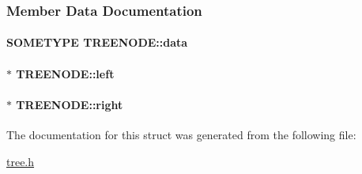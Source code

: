 \subsubsection{Member Data Documentation}
\hypertarget{structTREENODE_a16ae670d55c94f5358ae792a513e1e3c}{
\paragraph[{data}]{\setlength{\rightskip}{0pt plus 5cm}S\+O\+M\+E\+T\+Y\+P\+E T\+R\+E\+E\+N\+O\+D\+E\+::data}}\label{structTREENODE_a16ae670d55c94f5358ae792a513e1e3c}
\hypertarget{structTREENODE_a410b5b4e739703d7604d2bc7c5eddda9}{
\paragraph[{left}]{$\ast$ T\+R\+E\+E\+N\+O\+D\+E\+::left}}\label{structTREENODE_a410b5b4e739703d7604d2bc7c5eddda9}
\hypertarget{structTREENODE_a8b5bca93407a19121eefe5e0f08c4307}{
\paragraph[{right}]{$\ast$ T\+R\+E\+E\+N\+O\+D\+E\+::right}}\label{structTREENODE_a8b5bca93407a19121eefe5e0f08c4307}


The documentation for this struct was generated from the following file\+:\begin{DoxyCompactItemize}
\item 
\hyperlink{tree_8h}{tree.\+h}\end{DoxyCompactItemize}
